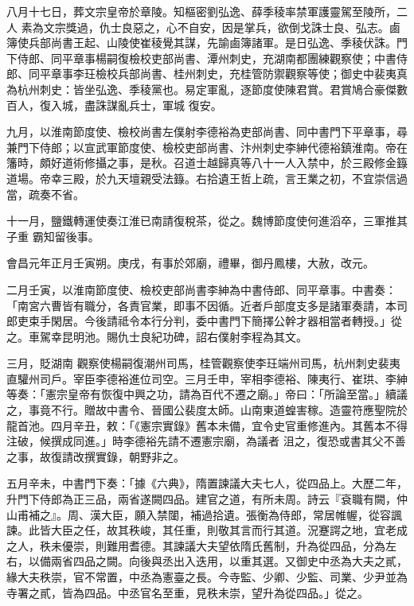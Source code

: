 \begin{pinyinscope}
 八月十七日，葬文宗皇帝於章陵。知樞密劉弘逸、薛季稜率禁軍護靈駕至陵所，二人
 素為文宗獎過，仇士良惡之，心不自安，因是掌兵，欲倒戈誅士良、弘志。鹵簿使兵部尚書王起、山陵使崔稜覺其謀，先諭鹵簿諸軍。是日弘逸、季稜伏誅。門下侍郎、同平章事楊嗣復檢校吏部尚書、潭州刺史，充湖南都團練觀察使；中書侍郎、同平章事李玨檢校兵部尚書、桂州刺史，充桂管防禦觀察等使；御史中裴夷真為杭州刺史：皆坐弘逸、季稜黨也。易定軍亂，逐節度使陳君賞。君賞鳩合豪傑數百人，復入城，盡誅謀亂兵士，軍城
 復安。



 九月，以淮南節度使、檢校尚書左僕射李德裕為吏部尚書、同中書門下平章事，尋兼門下侍郎；以宣武軍節度使、檢校吏部尚書、汴州刺史李紳代德裕鎮淮南。帝在籓時，頗好道術修攝之事，是秋。召道士越歸真等八十一人入禁中，於三殿修金籙道場。帝幸三殿，於九天壇親受法籙。右拾遺王哲上疏，言王業之初，不宜崇信過當，疏奏不省。



 十一月，鹽鐵轉運使奏江淮已南請復稅茶，從之。魏博節度使何進滔卒，三軍推其子重
 霸知留後事。



 會昌元年正月壬寅朔。庚戌，有事於郊廟，禮畢，御丹鳳樓，大赦，改元。



 二月壬寅，以淮南節度使、檢校吏部尚書李紳為中書侍郎、同平章事。中書奏：「南宮六曹皆有職分，各責官業，即事不因循。近者戶部度支多是諸軍奏請，本司郎吏束手閑居。今後請祗令本行分判，委中書門下簡擇公幹才器相當者轉授。」從之。車駕幸昆明池。賜仇士良紀功碑，詔右僕射李程為其文。



 三月，貶湖南
 觀察使楊嗣復潮州司馬，桂管觀察使李玨端州司馬，杭州刺史裴夷直驩州司戶。宰臣李德裕進位司空。三月壬申，宰相李德裕、陳夷行、崔珙、李紳等奏：「憲宗皇帝有恢復中興之功，請為百代不遷之廟。」帝曰：「所論至當。」續議之，事竟不行。贈故中書令、晉國公裴度太師。山南東道蝗害稼。造靈符應聖院於龍首池。四月辛丑，敕：「《憲宗實錄》舊本未備，宜令史官重修進內。其舊本不得注破，候撰成同進。」時李德裕先請不遷憲宗廟，為議者
 沮之，復恐或書其父不善之事，故復請改撰實錄，朝野非之。



 五月辛未，中書門下奏：「據《六典》，隋置諫議大夫七人，從四品上。大歷二年，升門下侍郎為正三品，兩省遂闕四品。建官之道，有所未周。詩云『袞職有闕，仲山甫補之』。周、漢大臣，願入禁闥，補過拾遺。張衡為侍郎，常居帷幄，從容諷諫。此皆大臣之任，故其秩峻，其任重，則敬其言而行其道。況蹇諤之地，宜老成之人，秩未優崇，則難用耆德。其諫議大夫望依隋氏舊制，升為從四品，分為左
 右，以備兩省四品之闕。向後與丞出入迭用，以重其選。又御史中丞為大夫之貳，緣大夫秩崇，官不常置，中丞為憲臺之長。今寺監、少卿、少監、司業、少尹並為寺署之貳，皆為四品。中丞官名至重，見秩未崇，望升為從四品。」從之。




\end{pinyinscope}
